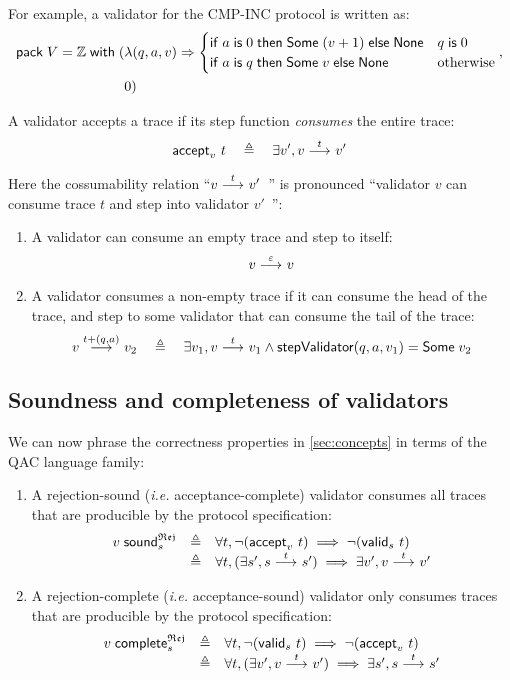 For example, a validator for the CMP-INC protocol is written as:
\begin{align*}
  \mathsf{pack}\;V=\mathbb Z\;\mathsf{with}\;(&\lambda(q,a,v)\Rightarrow
      \begin{cases}
        \mathsf{if}\; a\;\mathsf{is}\;0\;\mathsf{then}\;\mathsf{Some}\;(v+1)\;\mathsf{else}\;\mathsf{None}&q\;\mathsf{is}\;0\\
        \mathsf{if}\; a\;\mathsf{is}\; q\;\mathsf{then}\;\mathsf{Some}\;v\;\mathsf{else}\;\mathsf{None}&\mathrm{otherwise}
      \end{cases}
   ,\\
    &0)
\end{align*}

\begin{definition}
A validator accepts a trace if its step function {\em consumes} the entire
trace:
\[\mathsf{accept}_{v}~{t}\quad\triangleq\quad\exists v',v\overset{t}\longrightarrow_{} v'\]

Here the cossumability relation ``$v\overset{t}\longrightarrow_{} v'$~'' is pronounced ``validator
$v$ can consume trace $t$ and step into validator $v'$~'':
\begin{enumerate}
\item A validator can consume an empty trace and step to itself:
  \[v\overset{\varepsilon}\longrightarrow_{} v\]
\item A validator consumes a non-empty trace if it can consume the head of the
  trace, and step to some validator that can consume the tail of the trace:
  \[v\overset{t+(q,a)}\longrightarrow_{} v_2\quad\triangleq\quad\exists v_1,v\overset{t}\longrightarrow_{} v_1\wedge
  \mathsf{stepValidator} (q,a,v_1)=\mathsf{Some}\;v_2\]
\end{enumerate}
\end{definition}

\subsection{Soundness and completeness of validators}
We can now phrase the correctness properties in \autoref{sec:concepts} in terms
of the QAC language family:
\begin{enumerate}
  \item A rejection-sound ({\it i.e.} acceptance-complete) validator consumes
    all traces that are producible by the protocol specification:
    \[\begin{array}{lrl}
      v\;\mathsf{sound}_{s}^\mathfrak{Rej}&\triangleq&\forall t,\neg(\mathsf{accept}_{v}~{t})\implies\neg(\mathsf{valid}_{s}~{t})\\
      &\triangleq&\forall t,(\exists s',s\overset{t}\longrightarrow_{} s')\implies\exists v',v\overset{t}\longrightarrow_{} v'
    \end{array}\]
  \item A rejection-complete ({\it i.e.} acceptance-sound) validator only
    consumes traces that are producible by the protocol specification:
    \[\begin{array}{lrl}
      v\;\mathsf{complete}_{s}^\mathfrak{Rej}&\triangleq&\forall t,\neg(\mathsf{valid}_{s}~{t})\implies\neg(\mathsf{accept}_{v}~{t})\\
      &\triangleq&\forall t,(\exists v',v\overset{t}\longrightarrow_{} v')\implies\exists s',s\overset{t}\longrightarrow_{} s'
    \end{array}\]
\end{enumerate}
